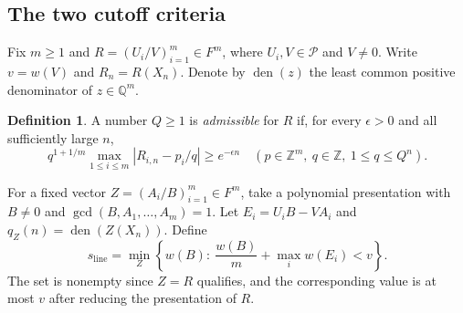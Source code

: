 \documentclass[11pt,a4paper,reqno]{amsart}
\theoremstyle{definition}
\newtheorem{definition}[theorem]{Definition}
\theoremstyle{remark}
\numberwithin{equation}{section}
\begin{document}
\subsection{The two cutoff criteria}

Fix \(m\ge1\) and \(R=(U_i/V)_{i=1}^m\in F^m\), where
\(U_i,V\in\mathcal P\) and \(V\ne0\). Write \(v=w(V)\) and
\(R_n=R(X_n)\). Denote by \(\operatorname{den}(z)\) the least
common positive denominator of \(z\in\mathbb Q^m\).

\begin{definition}
A number \(Q\ge1\) is \emph{admissible} for \(R\) if, for every
\(\epsilon>0\) and all sufficiently large \(n\),
\begin{equation}\label{eq:admissible}
 q^{1+1/m}\max_{1\le i\le m}|R_{i,n}-p_i/q|\ge e^{-\epsilon n}
 \quad(p\in\mathbb Z^m,\ q\in\mathbb Z,\ 1\le q\le Q^n).
\end{equation}
\end{definition}

For a fixed vector \(Z=(A_i/B)_{i=1}^m\in F^m\), take a polynomial
presentation with \(B\ne0\) and \(\gcd(B,A_1,\ldots,A_m)=1\).
Let \(E_i=U_iB-VA_i\) and \(q_Z(n)=\operatorname{den}(Z(X_n))\).
Define
\begin{equation}\label{eq:line-cutoff}
 s_{\mathrm{line}}=\min_Z
   \left\{w(B):\ \frac{w(B)}{m}+\max_i w(E_i)<v\right\}.
\end{equation}
The set is nonempty since \(Z=R\) qualifies, and the corresponding
value is at most \(v\) after reducing the presentation of \(R\).
\end{document}
